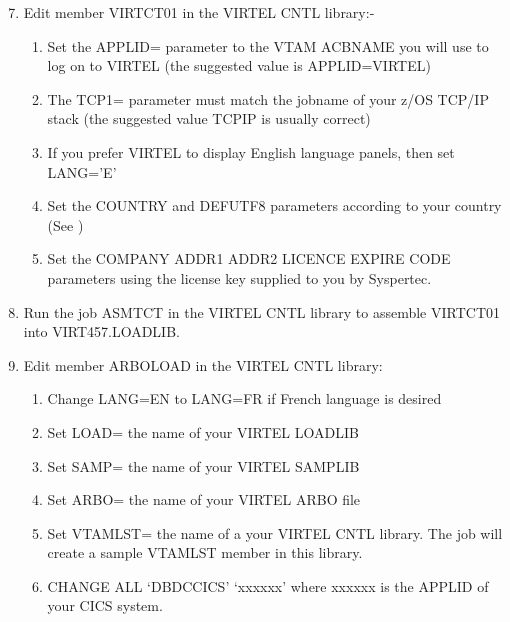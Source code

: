 \documentclass[letterpaper,10pt,english]{sphinxmanual}
\begin{document}
\begin{sphinxVerbatim}[commandchars=\\\{\}]
 
\end{sphinxVerbatim}
\begin{enumerate}
\setcounter{enumi}{6}
\item {} 
Edit member VIRTCT01 in the VIRTEL CNTL library:-
\begin{enumerate}
\item {} 
Set the APPLID= parameter to the VTAM ACBNAME you will use to log on to VIRTEL (the suggested value is APPLID=VIRTEL)

\item {} 
The TCP1= parameter must match the jobname of your z/OS TCP/IP stack (the suggested value TCPIP is usually correct)

\item {} 
If you prefer VIRTEL to display English language panels, then set LANG=’E’

\item {} 
Set the COUNTRY and DEFUTF8 parameters according to your country (See {\hyperref[\detokenize{Installation_Guide:v457ig-bookmark01}]{}})

\item {} 
Set the COMPANY ADDR1 ADDR2 LICENCE EXPIRE CODE parameters using the license key supplied to you by Syspertec.

\end{enumerate}

\item {} 
Run the job ASMTCT in the VIRTEL CNTL library to assemble VIRTCT01
into VIRT457.LOADLIB.

\item {} 
Edit member ARBOLOAD in the VIRTEL CNTL library:
\begin{enumerate}
\item {} 
Change LANG=EN to LANG=FR if French language is desired

\item {} 
Set LOAD= the name of your VIRTEL LOADLIB

\item {} 
Set SAMP= the name of your VIRTEL SAMPLIB

\item {} 
Set ARBO= the name of your VIRTEL ARBO file

\item {} 
Set VTAMLST= the name of a your VIRTEL CNTL library. The job will create a sample VTAMLST member in this library.

\item {} 
CHANGE ALL ‘DBDCCICS’ ‘xxxxxx’ where xxxxxx is the APPLID of your CICS system.

\end{enumerate}

\end{enumerate}
\end{document}
